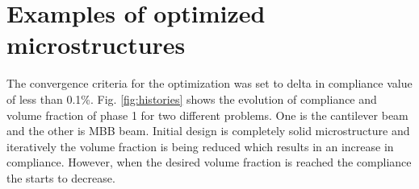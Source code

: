 \documentclass[openright,twoside]{iitkthesis}
\begin{document}
\section{Examples of optimized microstructures}
The convergence criteria for the optimization was set to delta in compliance value of less than 0.1\%. Fig. \ref{fig:histories} shows the evolution of compliance and volume fraction of phase 1 for two different problems. One is the cantilever beam and the other is MBB beam. Initial design is completely solid microstructure and iteratively the volume fraction is being reduced which results in an increase in compliance. However, when the desired volume fraction is reached the compliance the starts to decrease.
\begin{figure}[H]
\begin{center}
\end{center}
\end{figure}
\end{document}

